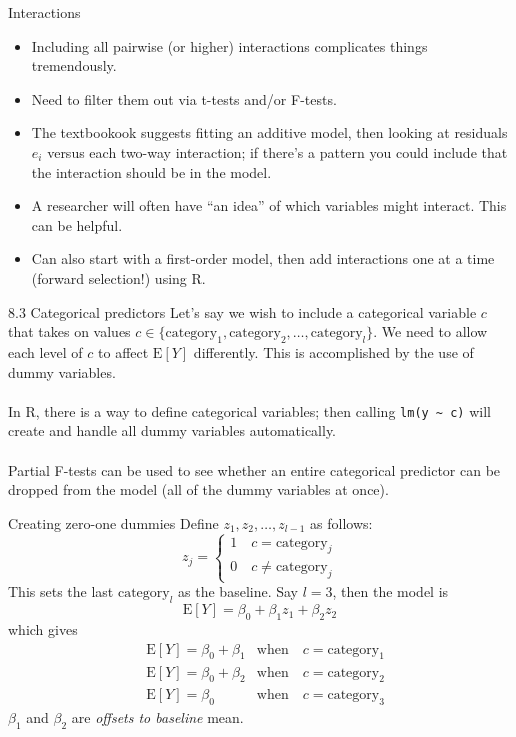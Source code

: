 \documentclass{beamer}
\newcommand{\E}{\mathrm{E}}
\begin{document}
\begin{frame}{Interactions}
\begin{itemize}
\item Including all pairwise (or higher) interactions complicates things tremendously.
\item\pause Need to filter them out via t-tests and/or F-tests.
\item\pause The textbookook suggests fitting an additive model, then looking at residuals
$e_i$ versus each two-way interaction; \pause if there’s a pattern you
could include that the interaction should be in the model.
\item\pause A researcher will often have ``an idea''
of which variables might interact. \pause This can be helpful.
\item\pause Can also start with a first-order model, then add interactions one at a time (forward selection!) using {\sc R}.
\end{itemize}
\end{frame}

\begin{frame}[fragile]{8.3 Categorical predictors}
Let's say we wish to include a categorical variable $c$
that takes on values $c \in \{\text{category}_1, \text{category}_2, \ldots, \text{category}_l\}$. \pause We need to allow each
level of $c$ to affect $\E[Y]$ differently. \pause This is accomplished by
the use of dummy variables.\\~\\

\pause In {\sc R}, there is a way to define categorical variables; \pause then calling \verb|lm(y ~ c)| will create and handle all dummy variables automatically.\\~\\

\pause Partial F-tests can be used to see whether an entire categorical predictor can be dropped from the model (all of the dummy variables at once).
\end{frame}

\begin{frame}{Creating zero-one dummies}
Define $z_1, z_2, \ldots, z_{l-1}$ as follows:
$$
z_j=\begin{cases}
1 \quad c = \text{category}_j\\
0 \quad c \ne \text{category}_j
\end{cases}
$$
\pause This sets the last $\text{category}_l$ as the baseline. \pause Say $l=3$, then the model is
$$
\E[Y]=\beta_0+\beta_1 z_1 + \beta_2 z_2
$$
\pause which gives
\begin{align*}
&\E[Y] = \beta_0 + \beta_1&\text{when}\quad c=\text{category}_1\\
&\E[Y] = \beta_0 + \beta_2&\text{when}\quad c=\text{category}_2\\
&\E[Y] = \beta_0&\text{when}\quad c=\text{category}_3
\end{align*}
$\beta_1$ and $\beta_2$ are \textit{offsets to baseline} mean.
\end{frame}
\end{document}
